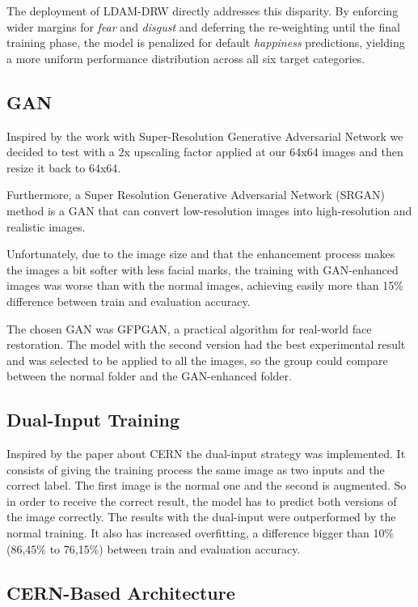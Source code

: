 The deployment of LDAM-DRW directly addresses this disparity. By enforcing wider margins for \textit{fear} and \textit{disgust} and deferring the re-weighting until the final training phase, the model is penalized for default \textit{happiness} predictions, yielding a more uniform performance distribution across all six target categories.

\subsection{GAN}

Inspired by the work  with Super-Resolution Generative Adversarial Network \cite{Siam2022EmotionDetection} we decided to test with a 2x upscaling factor applied at our 64x64 images and then resize it back to 64x64.


Furthermore, a Super Resolution Generative Adversarial Network (SRGAN) method is a GAN that can convert low-resolution images into high-resolution and realistic images. \cite{WEI2024127207}

Unfortunately, due to the image size and that the enhancement process makes the images a bit softer with less facial marks, the training with GAN-enhanced images was worse than with the normal images, achieving easily more than 15\% difference between train and evaluation accuracy.

The chosen GAN was GFPGAN, a practical algorithm for real-world face restoration. The model with the second version had the best experimental result and was selected to be applied to all the images, so the group could compare between the normal folder and the GAN-enhanced folder. 


\subsection{Dual-Input Training}

Inspired by the paper about CERN\cite{GERA20229} the dual-input strategy was implemented. It consists of giving the training process the same image as two inputs and the correct label. The first image is the normal one and the second is augmented. So in order to receive the correct result, the model has to predict both versions of the image correctly. The results with the dual-input were outperformed by the normal training. It also has increased overfitting, a difference bigger than 10\% (86,45\% to 76,15\%) between train and evaluation accuracy.

\subsection{CERN-Based Architecture}

